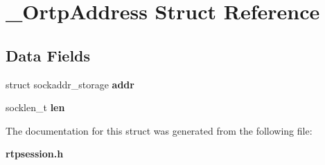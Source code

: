 \section{\+\_\+\+Ortp\+Address Struct Reference}
\label{struct__OrtpAddress}
\subsection*{Data Fields}
\begin{DoxyCompactItemize}
\item 
\mbox{\label{struct__OrtpAddress_a97fe5293610347f52cf810549d752e15}} 
struct sockaddr\+\_\+storage {\bfseries addr}
\item 
\mbox{\label{struct__OrtpAddress_a4b7fb98d49476e41df8de257e2d88028}} 
socklen\+\_\+t {\bfseries len}
\end{DoxyCompactItemize}


The documentation for this struct was generated from the following file\+:\begin{DoxyCompactItemize}
\item 
\textbf{ rtpsession.\+h}\end{DoxyCompactItemize}

